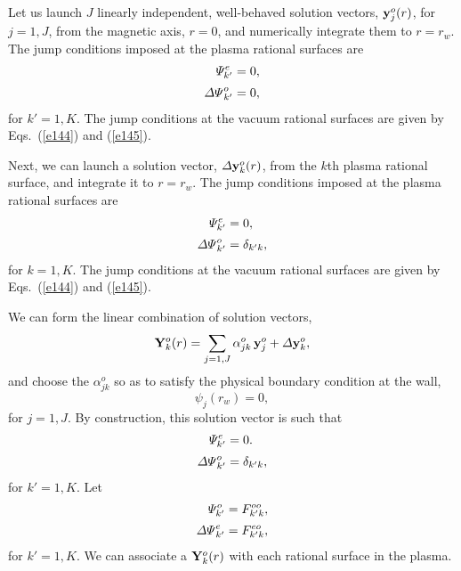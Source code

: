 \documentclass[12pt,prb,aps,notitlepage]{revtex4-1}
\begin{document}
Let us launch $J$ linearly independent, well-behaved  solution vectors, ${\bf y}_j^o(r)$, for $j=1,J$, from the magnetic axis,
$r=0$, and numerically integrate them to $r=r_w$. The jump conditions imposed at the plasma rational surfaces are
\begin{align}
{\mit\Psi}_{k'}^e&= 0,\\[0.5ex]
{\mit\Delta\Psi}_{k'}^o &= 0,
\end{align}
for $k'=1,K$. The jump conditions at the vacuum rational surfaces are
given  by Eqs.~(\ref{e144}) and (\ref{e145}).  
 
 Next, we can launch a solution vector, ${\mit\Delta}{\bf y}_k^o(r)$,  from the $k$th plasma rational surface, and
integrate it to $r=r_w$. 
The jump conditions imposed at the 
plasma rational surfaces are
\begin{align}
{\mit\Psi}_{k'}^e &= 0,\\[0.5ex]
{\mit\Delta\Psi}_{k'}^o &= \delta_{k'k},
\end{align}
for $k=1,K$. The jump conditions at the vacuum rational surfaces are
given by Eqs.~(\ref{e144}) and (\ref{e145}). 

We can  form  the linear combination of solution vectors,
\begin{equation}
{\bf Y}_k^o(r) = \sum_{j=1,J} \alpha_{jk}^o\,{\bf y}_j^o + {\mit\Delta}{\bf y}_k^o,
\end{equation}
and choose the $\alpha_{jk}^o$ so as to satisfy the physical boundary condition at the wall, 
\begin{equation}\label{e176}
\psi_j(r_w) = 0,
\end{equation}
for $j=1,J$. 
By construction, this solution vector is such that
\begin{align}
{\mit\Psi}_{k'}^e &= 0.\\[0.5ex]
{\mit\Delta\Psi}_{k'}^o &= \delta_{k'k},
\end{align}
for $k'=1,K$. 
Let
\begin{align}
{\mit\Psi}_{k'}^o &=F_{k'k}^{oo},\\[0.5ex]
{\mit\Delta\Psi}_{k'}^e &=F_{k'k}^{eo},
\end{align}
for $k'=1,K$. We can associate a ${\bf Y}_k^o (r)$ with each  rational surface in the plasma. 
\end{document}
